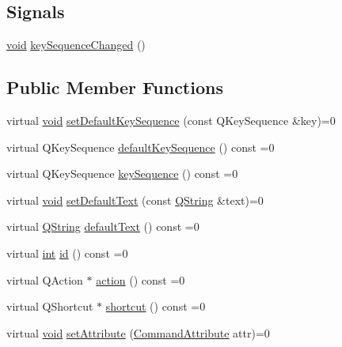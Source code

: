 \subsection*{Signals}
\begin{DoxyCompactItemize}
\item 
\hyperlink{group___u_a_v_objects_plugin_ga444cf2ff3f0ecbe028adce838d373f5c}{void} \hyperlink{group___core_plugin_ga4e8398381143aeb4216199854fdaf0ab}{key\-Sequence\-Changed} ()
\end{DoxyCompactItemize}
\subsection*{Public Member Functions}
\begin{DoxyCompactItemize}
\item 
virtual \hyperlink{group___u_a_v_objects_plugin_ga444cf2ff3f0ecbe028adce838d373f5c}{void} \hyperlink{group___core_plugin_ga9edb60253a233526349538b2fcb2e093}{set\-Default\-Key\-Sequence} (const Q\-Key\-Sequence \&key)=0
\item 
virtual Q\-Key\-Sequence \hyperlink{group___core_plugin_ga0c83dee8e3b5d218dd4273e801bfe106}{default\-Key\-Sequence} () const =0
\item 
virtual Q\-Key\-Sequence \hyperlink{group___core_plugin_ga489c0ef6a565b2af079f1fc61c2bf1d2}{key\-Sequence} () const =0
\item 
virtual \hyperlink{group___u_a_v_objects_plugin_ga444cf2ff3f0ecbe028adce838d373f5c}{void} \hyperlink{group___core_plugin_ga01b34fc1e361fb10f26bce17e7f1abd7}{set\-Default\-Text} (const \hyperlink{group___u_a_v_objects_plugin_gab9d252f49c333c94a72f97ce3105a32d}{Q\-String} \&text)=0
\item 
virtual \hyperlink{group___u_a_v_objects_plugin_gab9d252f49c333c94a72f97ce3105a32d}{Q\-String} \hyperlink{group___core_plugin_gafb9261fe7f3e6b06f367257eae11d0ed}{default\-Text} () const =0
\item 
virtual \hyperlink{ioapi_8h_a787fa3cf048117ba7123753c1e74fcd6}{int} \hyperlink{group___core_plugin_ga86ee1c7ad9c36b2b3b4d6d5c4a8c7782}{id} () const =0
\item 
virtual Q\-Action $\ast$ \hyperlink{group___core_plugin_ga68bf6b0115ef45e9a734956f3b0d40c5}{action} () const =0
\item 
virtual Q\-Shortcut $\ast$ \hyperlink{group___core_plugin_ga3cbc83d8c6c353b4b28c436a691ae970}{shortcut} () const =0
\item 
virtual \hyperlink{group___u_a_v_objects_plugin_ga444cf2ff3f0ecbe028adce838d373f5c}{void} \hyperlink{group___core_plugin_ga07112a6a39d461f7bba7e470077ef3f4}{set\-Attribute} (\hyperlink{group___core_plugin_ga4d899c1f711159a432afeab3eb78c917}{Command\-Attribute} attr)=0

\end{DoxyCompactItemize}
